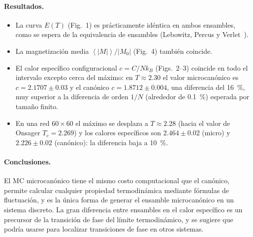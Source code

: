 \documentclass[11pt,letterpaper]{article}
\newcommand{\avg}[1]{\left\langle #1 \right\rangle}
\newcommand{\kB}{k_{B}}
\begin{document}
\paragraph{Resultados.}
\begin{itemize}[leftmargin=1.2em,itemsep=1pt]
\item La curva $E(T)$ (Fig.~1) es prácticamente idéntica en ambos ensambles, como
se espera de la equivalencia de ensambles (Lebowitz, Percus y Verlet~\cite{lpv67}).
\item La magnetización media $\avg{|M|}/|M_0|$ (Fig.~4) también coincide.
\item El calor específico configuracional $c=C/N\kB$ (Figs.~2--3) coincide
en todo el intervalo excepto cerca del máximo: en $T\approx2.30$ el valor
microcanónico es $c=2.1707\pm0.03$ y el canónico $c=1.8712\pm0.004$, una diferencia
del 16~\%, muy superior a la diferencia de orden $1/N$ (alrededor de 0.1~\%) esperada por tamaño
finito.
\item En una red $60\times60$ el máximo se desplaza a $T\approx2.28$ (hacia el valor
de Onsager $T_c=2.269$) y los calores específicos son $2.464\pm0.02$ (micro) y
$2.226\pm0.02$ (canónico): la diferencia baja a 10~\%.
\end{itemize}

\paragraph{Conclusiones.}
El MC microcanónico tiene el mismo costo computacional que el canónico, permite
calcular cualquier propiedad termodinámica mediante fórmulas de fluctuación, y es
la única forma de generar el ensamble microcanónico en un sistema discreto. La
gran diferencia entre ensambles en el calor específico es un precursor de la
transición de fase del límite termodinámico, y se sugiere que podría usarse
para localizar transiciones de fase en otros sistemas.

\end{document}

